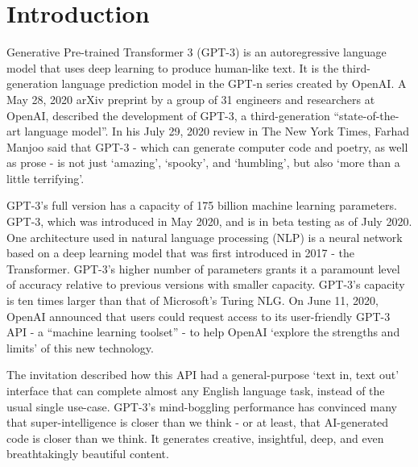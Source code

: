 \documentclass[12pt, a4paper]{report}
\begin{document}
\tableofcontents
\thispagestyle{fancy}

\chapter*{Introduction}
\label{chap:introduction}
\thispagestyle{fancy}

\hspace{0.5cm} Generative Pre-trained Transformer 3 (GPT-3) is an autoregressive language model that uses deep learning to produce human-like text. It is the third-generation language prediction model in the GPT-n series created by OpenAI\cite{wiki:gpt3}. A May 28, 2020 arXiv preprint by a group of 31 engineers and researchers at OpenAI, described the development of GPT-3, a third-generation ``state-of-the-art language model''. In his July 29, 2020 review in The New York Times, Farhad Manjoo said that GPT-3 - which can generate computer code and poetry, as well as prose - is not just `amazing', `spooky', and `humbling', but also `more than a little terrifying'\cite{art:hhwt}.

GPT-3's full version has a capacity of 175 billion machine learning parameters. GPT-3, which was introduced in May 2020, and is in beta testing as of July 2020\cite{art:wtla}. One architecture used in natural language processing (NLP) is a neural network based on a deep learning model that was first introduced in 2017 - the Transformer\cite{2017arXiv170603762V}. GPT-3's higher number of parameters grants it a paramount level of accuracy relative to previous versions with smaller capacity. GPT-3's capacity is ten times larger than that of Microsoft's Turing NLG. On June 11, 2020, OpenAI announced that users could request access to its user-friendly GPT-3 API - a ``machine learning toolset'' - to help OpenAI `explore the strengths and limits' of this new technology.

The invitation described how this API had a general-purpose `text in, text out' interface that can complete almost any English language task, instead of the usual single use-case. GPT-3's mind-boggling performance has convinced many that super-intelligence is closer than we think - or at least, that AI-generated code is closer than we think. It generates creative, insightful, deep, and even breathtakingly beautiful content\cite{art:wtla}.

\end{document}
